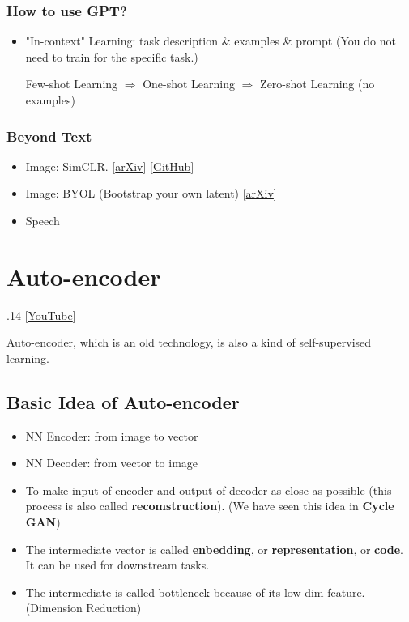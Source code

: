 \documentclass[11pt]{book}
\begin{document}
\subsection*{How to use GPT?}
\begin{itemize}
    \item "In-context" Learning: task description \& examples \& prompt (You do not need to train for the specific task.)
    
    Few-shot Learning $\Rightarrow$ One-shot Learning $\Rightarrow$ Zero-shot Learning (no examples)
\end{itemize}
\subsection*{Beyond Text}
\begin{itemize}
    \item Image: SimCLR. [\href{https://arxiv.org/abs/2002.05709}{arXiv}] [\href{https://github.com/google-research/simclr}{GitHub}]
    \item Image: BYOL (Bootstrap your own latent) [\href{https://arxiv.org/abs/2006.07733}{arXiv}]
    \item Speech
\end{itemize}

\chapter{Auto-encoder}
.14 [\href{https://www.youtube.com/watch?v=3oHlf8-J3Nc&list=PLJV_el3uVTsMhtt7_Y6sgTHGHp1Vb2P2J&index=22}{YouTube}]

Auto-encoder, which is an old technology, is also a kind of self-supervised learning.

\section{Basic Idea of Auto-encoder}
\begin{itemize}
    \item NN Encoder: from image to vector
    \item NN Decoder: from vector to image
\end{itemize}
\begin{itemize}
    \item To make input of encoder and output of decoder as close as possible (this process is also called \textbf{recomstruction}). (We have seen this idea in \textbf{Cycle GAN})
    \item The intermediate vector is called \textbf{enbedding}, or \textbf{representation}, or \textbf{code}. It can be used for downstream tasks.
    \item The intermediate is called bottleneck because of its low-dim feature. (Dimension Reduction)
\end{itemize}
\end{document}

